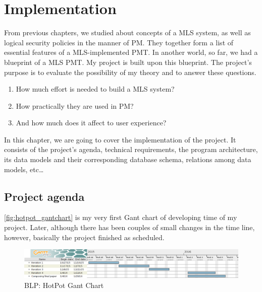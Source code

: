 
\chapter{Implementation} %

\label{ch:implementation} 


From previous chapters, we studied about concepts of a MLS system, as well as logical security policies in the manner of PM.
They together form a list of essential features of a MLS-implemented PMT.
In another world, so far, we had a blueprint of a MLS PMT. 
My \myProject project is built upon this blueprint.
The project's purpose is to evaluate the possibility of my theory and to answer these questions.

\begin{enumerate}
\item How much effort is needed to build a MLS system? 
\item How practically they are used in PM?
\item And how much does it affect to user experience?
\end{enumerate}

In this chapter, we are going to cover the implementation of the project.
It consists of the project's agenda, technical requirements, the program architecture, its data models and their corresponding database schema, relations among data models, etc\dots


\section{Project agenda}
\label{ch:implementation:project_agenda}

\autoref{fig:hotpot_gantchart} is my very first Gant chart of developing time of my project.
Later, although there has been couples of small changes in the time line, however, basically the project finished as scheduled.

\begin{figure}[bth]                                                                                                                                                  
\myfloatalign
\includegraphics[width=1.0\linewidth]{gfx/chapter_4/hotpot_gantchart}
\caption[HotPot Gant chart]{BLP: HotPot Gant Chart}
\label{fig:hotpot_gantchart}
\end{figure}

